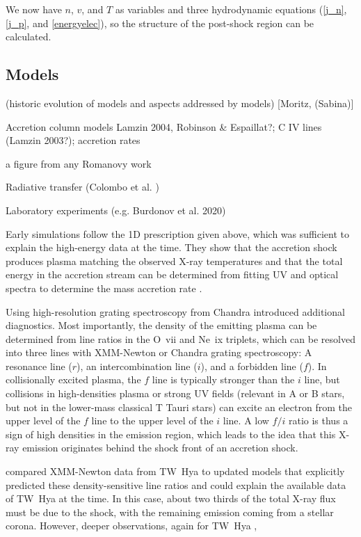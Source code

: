 \documentclass[graybox, nosecnum]{svmult}
\begin{document}
We now have $n$, $v$, and $T$ as variables and three hydrodynamic equations (\ref{j_n}, \ref{j_p}, and \ref{energyelec}), so the structure of the post-shock region can be calculated.


\subsection{Models}

\label{sect:accretionmodels}
{\color{blue}(historic evolution of models and aspects addressed by models) [Moritz, (Sabina)]

Accretion column models Lamzin 2004, Robinson & Espaillat?; C IV lines (Lamzin 2003?); accretion rates

a figure from any Romanovy work


Radiative transfer (Colombo et al. )

Laboratory experiments (e.g. Burdonov et al. 2020)
}

Early simulations follow the 1D prescription given above, which was sufficient to explain the high-energy data at the time. They show that the accretion shock produces plasma matching the observed X-ray temperatures \citep{lamzin_1998} and that the total energy in the accretion stream can be determined from fitting UV and optical spectra to determine the mass accretion rate \citep{calvet_1998}.

Using high-resolution grating spectroscopy from Chandra \citet{Kastner_2002} introduced additional diagnostics. Most importantly, the density of the emitting plasma can be determined from line ratios in the O~{\sc vii} and Ne~{\sc ix} triplets, which can be resolved into three lines with XMM-Newton or Chandra grating spectroscopy: A resonance line ($r$), an intercombination line ($i$), and a forbidden line ($f$). In collisionally excited plasma, the $f$ line is typically stronger than the $i$ line, but collisions in high-densities plasma or strong UV fields (relevant in A or B stars, but not in the lower-mass classical T Tauri stars) can excite an electron from the upper level of the $f$ line to the upper level of the $i$ line. A low $f/i$ ratio is thus a sign of high densities in the emission region, which leads to the idea that this X-ray emission originates behind the shock front of an accretion shock.

\citet{Guenther_2007} compared XMM-Newton data from TW~Hya to updated models that explicitly predicted these density-sensitive line ratios and could explain the available data of TW~Hya at the time. In this case, about two thirds of the total X-ray flux must be due to the shock, with the remaining emission coming from a stellar corona. However, deeper observations, again for TW~Hya \citep{Brickhouse_2010}, 
\end{document}
